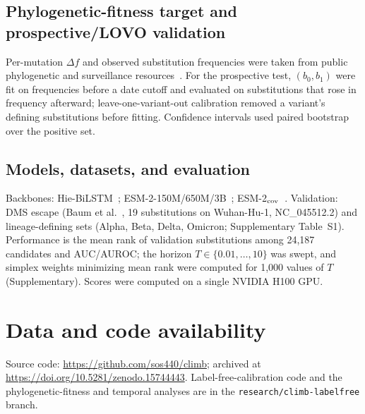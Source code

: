 \documentclass[11pt]{article}
\begin{document}
\subsection*{Phylogenetic-fitness target and prospective/LOVO validation}
Per-mutation $\Delta f$ and observed substitution frequencies were taken from public phylogenetic and surveillance resources~\cite{bloom2023fitness}. For the prospective test, $(b_0,b_1)$ were fit on frequencies before a date cutoff and evaluated on substitutions that rose in frequency afterward; leave-one-variant-out calibration removed a variant's defining substitutions before fitting. Confidence intervals used paired bootstrap over the positive set.

\subsection*{Models, datasets, and evaluation}
Backbones: Hie-BiLSTM~\cite{hie2021learning}; ESM-2-150M/650M/3B~\cite{lin2023evolutionary}; ESM-2$_{\rm cov}$~\cite{covfit2025}. Validation: DMS escape (Baum et al.~\cite{baum2020antibody}, 19 substitutions on Wuhan-Hu-1, NC\_045512.2) and lineage-defining sets (Alpha, Beta, Delta, Omicron; Supplementary Table~S1). Performance is the mean rank of validation substitutions among 24,187 candidates and AUC/AUROC; the horizon $T\in\{0.01,\dots,10\}$ was swept, and simplex weights minimizing mean rank were computed for 1,000 values of $T$ (Supplementary). Scores were computed on a single NVIDIA H100 GPU.

\section*{Data and code availability}
Source code: \url{https://github.com/sos440/climb}; archived at \url{https://doi.org/10.5281/zenodo.15744443}. Label-free-calibration code and the phylogenetic-fitness and temporal analyses are in the \texttt{research/climb-labelfree} branch.



\end{document}
